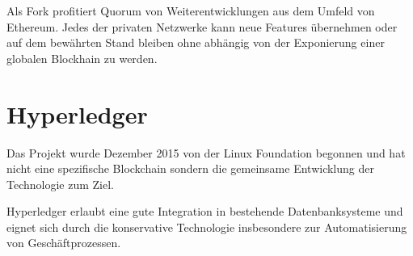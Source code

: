 Als Fork profitiert Quorum von Weiterentwicklungen aus dem Umfeld von Ethereum. Jedes der privaten Netzwerke kann neue Features übernehmen oder auf dem bewährten Stand bleiben ohne abhängig von der Exponierung einer globalen Blockhain zu werden.

\section{Hyperledger}\label{impl:hyperledger}

Das Projekt wurde Dezember 2015 von der Linux Foundation begonnen und hat nicht eine spezifische Blockchain sondern die gemeinsame Entwicklung der Technologie zum Ziel.

Hyperledger erlaubt eine gute Integration in bestehende Datenbanksysteme und eignet sich durch die konservative Technologie insbesondere zur Automatisierung von Geschäftprozessen.



